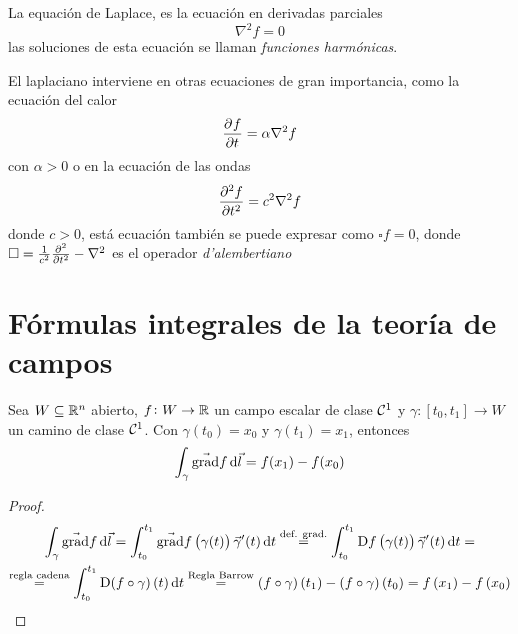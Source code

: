 \begin{obs}
    La equación de Laplace, es la ecuación en derivadas parciales
    \[
        \nabla^2 f = 0
    \]
    las soluciones de esta ecuación se llaman \emph{funciones harmónicas}.
\end{obs}
\begin{obs}
    El laplaciano interviene en otras ecuaciones de gran importancia, como la ecuación del calor
    \[
        \pdv{f}{t} = \alpha \nabla^2 f
    \]
    con $\alpha > 0$ o en la ecuación de las ondas
    \[
        \pdv[2]{f}{t} = c^2 \nabla^2 f
    \]
    donde $c > 0$, está ecuación tambi\'en se puede expresar como $\square f = 0$, donde $\square = \frac{1}{c^2} \pdv[2]{}{t} - \nabla^2$
    es el operador \emph{d'alembertiano}
\end{obs}

\section{Fórmulas integrales de la teoría de campos}

\begin{prop}
    Sea $W \subseteq \real^n$ abierto, $f \colon W \to \real$ un campo escalar de clase $\C^1$ y $\gamma \colon [t_0,t_1] \to W$
    un camino de clase $\C^1$. Con $\gamma\left( t_0 \right) = x_0$ y $\gamma\left( t_1 \right) = x_1$, entonces
    \[
        \int_\gamma \vec{\grad} f \dif \vec{l} = f(x_1) - f(x_0)
    \]
\end{prop}
\begin{proof}
    \begin{gather*}
        \int_\gamma \vec{\grad} f \dif \vec{l} = \int^{t_1}_{t_0} \vec{\grad} f\left( \gamma(t) \right) \vec{\gamma}^\prime(t) \dif t
        \stackrel{\text{def. grad.}}{=} \int^{t_1}_{t_0} \Dif f\left( \gamma(t) \right) \vec{\gamma}^\prime (t) \dif t = \\
        \stackrel{\text{regla cadena}}{=} \int^{t_1}_{t_0} \Dif \left( f \circ \gamma \right)(t) \dif t \stackrel{\text{Regla Barrow}}{=}
        \left( f \circ \gamma \right)\left( t_1 \right) - \left( f \circ \gamma \right)\left( t_0 \right) = f\left( x_1 \right) - 
        f\left( x_0 \right)
    \end{gather*}
\end{proof}

